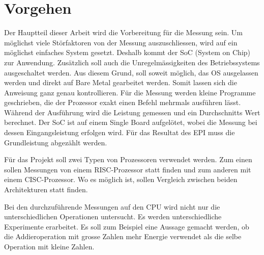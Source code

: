 \chapter{Vorgehen}

Der Hauptteil dieser Arbeit wird die Vorbereitung für die Messung sein. Um möglichst viele Störfaktoren
von der Messung auszuschliessen, wird auf ein möglichst einfaches System gesetzt. Deshalb kommt der  SoC
(System on Chip) zur Anwendung. Zusätzlich soll auch die Unregelmässigkeiten des Betriebssystems ausgeschaltet
werden. Aus diesem Grund, soll soweit möglich, das OS ausgelassen werden und direkt auf Bare Metal gearbeitet werden.
Somit lassen sich die Anweisung ganz genau kontrollieren. Für die Messung werden kleine Programme geschrieben, die der Prozessor
exakt einen Befehl mehrmals ausführen lässt. Während der Ausführung wird die Leistung gemessen und ein Durchschnitts Wert berechnet.
Der SoC ist auf einem Single Board aufgelötet, wobei
die Messung bei dessen Eingangsleistung erfolgen wird. Für das Resultat des EPI muss die Grundleistung abgezählt
werden.
\par
Für das Projekt soll zwei Typen von Prozessoren verwendet werden. Zum einen sollen Messungen von einem RISC-Prozessor
statt finden und zum anderen mit einem CISC-Prozessor. Wo es möglich ist, sollen Vergleich zwischen beiden
Architekturen statt finden.
\par
Bei den durchzuführende Messungen auf den CPU wird nicht nur die unterschiedlichen Operationen untersucht. Es werden 
unterschiedliche Experimente erarbeitet. Es soll zum Beispiel eine Aussage gemacht werden, ob die Addieroperation
mit grosse Zahlen mehr Energie verwendet als die selbe Operation mit kleine Zahlen.


